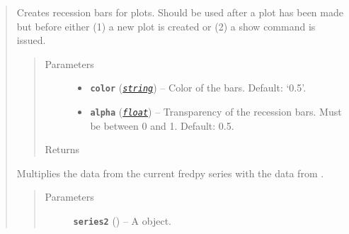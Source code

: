 \documentclass[letterpaper,10pt,english]{sphinxmanual}
\begin{document}
\begin{fulllineitems}
\begin{quote}
\begin{fulllineitems}
\begin{quote}
\begin{description}
\end{description}\end{quote}

\end{fulllineitems}


\begin{fulllineitems}
\label{series_class:fredpy.series.recessions}
Creates recession bars for plots. Should be used after a plot has been made but before either (1) a new plot is created or (2) a show command is issued.
\begin{quote}\begin{description}
\item[{Parameters}] \leavevmode\begin{itemize}
\item {} 
\textbf{\texttt{color}} (\href{https://docs.python.org/2/library/string.html\#module-string}{\emph{\texttt{string}}}) -- Color of the bars. Default: `0.5'.

\item {} 
\textbf{\texttt{alpha}} (\href{https://docs.python.org/2/library/functions.html\#float}{\emph{\texttt{float}}}) -- Transparency of the recession bars. Must be between 0 and 1. Default: 0.5.

\end{itemize}

\item[{Returns}] \leavevmode


\end{description}\end{quote}

\end{fulllineitems}


\begin{fulllineitems}
\label{series_class:fredpy.series.times}
Multiplies the data from the current fredpy series with the data from .
\begin{quote}\begin{description}
\item[{Parameters}] \leavevmode
\textbf{\texttt{series2}} ({\hyperref[series_class:fredpy.series]{}}) -- A  object.


\end{description}
\end{quote}
\end{fulllineitems}
\end{quote}
\end{fulllineitems}
\end{document}
